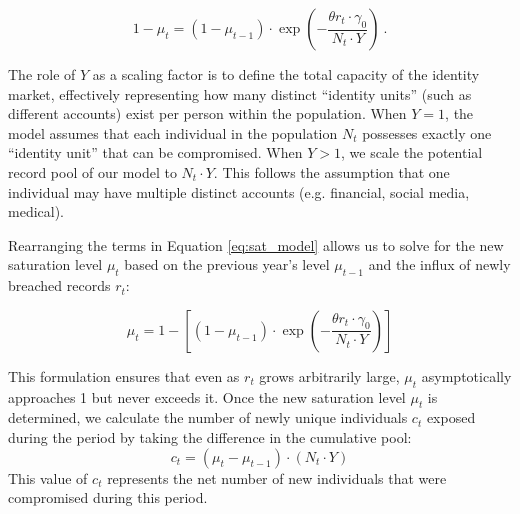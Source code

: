 \begin{equation}
\label{eq:sat_model}
    1 - \mu_t = (1 - \mu_{t-1}) \cdot \exp\left( - \frac{\theta r_t \cdot \gamma_0 }{N_t \cdot Y } \right)~. 
\end{equation}

The role of $Y$ as a scaling factor is to define the total capacity of the identity market, effectively representing how many distinct ``identity units'' (such as different accounts) exist per person within the population. When $Y=1$, the model assumes that each individual in the population $N_t$ 
possesses exactly one ``identity unit'' that can be compromised. When $Y>1$, we scale the potential record pool of our model to $N_t \cdot Y$. This follows the assumption that one individual may have multiple distinct accounts (e.g. financial, social media, medical).

Rearranging the terms in Equation \ref{eq:sat_model} allows us to solve for the new saturation level $\mu_t$ based on the previous year's level $\mu_{t-1}$ and the influx of newly breached records $r_t$: 


\begin{equation}
\mu_t = 1 - \left[ (1 - \mu_{t-1}) \cdot \exp\left( -\frac{\theta r_t \cdot \gamma_0}{N_t \cdot Y } \right) \right]
\end{equation}


This formulation ensures that even as $r_t$ grows arbitrarily large, $\mu_t$ asymptotically approaches 1 but never exceeds it. Once the new saturation level $\mu_t$ is determined, we calculate the number of newly unique individuals $c_t$ exposed during the period by taking the difference in the cumulative pool: $$c_t = (\mu_t - \mu_{t-1}) \cdot (N_t \cdot Y)$$ This value of $c_t$ represents the net number of new individuals that were compromised during this period. 

